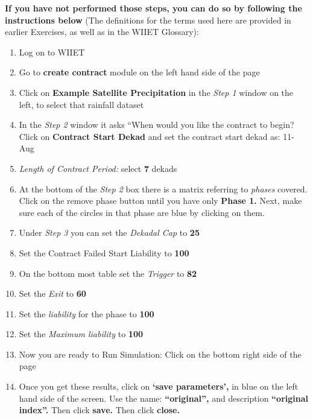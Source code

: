 \documentclass[letterpaper,10pt,english]{sphinxmanual}
\begin{document}
\textbf{If you have not performed those steps, you can do so by following the instructions below} (The definitions for the terms used here are provided in earlier Exercises, as well as in the WIIET Glossary):
\begin{enumerate}
\item {} 
Log on to WIIET

\item {} 
Go to \textbf{create contract} module on the left hand side of the page

\item {} 
Click on \textbf{Example Satellite Precipitation} in the \emph{Step 1} window on the left, to select that rainfall dataset

\item {} 
In the \emph{Step 2} window it asks ``When would you like the contract to begin? Click on \textbf{Contract Start Dekad} and set the contract start dekad as: 11-Aug

\item {} 
\emph{Length of Contract Period:} select \textbf{7} dekads

\item {} 
At the bottom of the \emph{Step 2} box there is a matrix referring to \emph{phases} covered. Click on the remove phase button until you have only \textbf{Phase 1.} Next, make sure each of the circles in that phase are blue by clicking on them.

\item {} 
Under \emph{Step 3} you can set the \emph{Dekadal Cap} to \textbf{25}

\item {} 
Set the Contract Failed Start Liability to \textbf{100}

\item {} 
On the bottom most table set the \emph{Trigger} to \textbf{82}

\item {} 
Set the \emph{Exit} to \textbf{60}

\item {} 
Set the \emph{liability} for the phase to \textbf{100}

\item {} 
Set the \emph{Maximum liability} to \textbf{100}

\item {} 
Now you are ready to Run Simulation: Click on the bottom right side of the page

\item {} 
Once you get these results, click on \textbf{`save parameters',} in blue on the left hand side of the screen.  Use the name: \textbf{``original'',} and description \textbf{``original index''.} Then click \textbf{save.} Then click \textbf{close.}

\end{enumerate}
\end{document}
